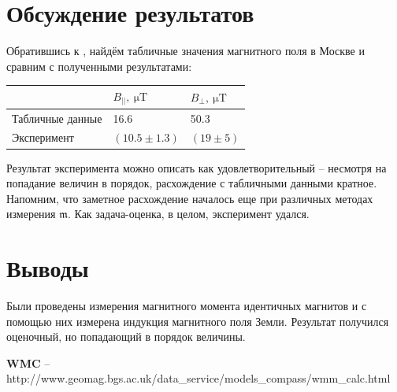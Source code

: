 \documentclass[12pt, a4paper]{article}
\newcommand{\m}{\mathfrak{m}}
\begin{document}
\newpage
\section{Обсуждение результатов}
Обратившись к \cite{wmc}, найдём табличные значения магнитного поля в Москве и сравним с полученными результатами:
\begin{table}[H]
\begin{tabular}{|l|l|l|}
\hline
                 & $B_{||},~\mathrm{\mu T}$ & $B_{\perp},~\mathrm{\mu T}$ \\ \hline
Табличные данные & 16.6 & 50.3   \\ \hline
Эксперимент      &  $(10.5\pm 1.3)$    &   $(19\pm 5)$   \\ \hline
\end{tabular}
\end{table}

Результат эксперимента можно описать как удовлетворительный -- несмотря на попадание величин в порядок, расхождение с табличными данными кратное.  Напомним, что заметное расхождение началось еще при различных методах измерения $\m$. Как задача-оценка, в целом, эксперимент удался.

\section{Выводы}
Были проведены измерения магнитного момента идентичных магнитов и с помощью них измерена индукция магнитного поля Земли. Результат получился оценочный, но попадающий в порядок величины.

\begin{thebibliography}{}
       \textbf{WMC} -- http://www.geomag.bgs.ac.uk/data\_service/models\_compass/wmm\_calc.html
\end{thebibliography}
\end{document}
